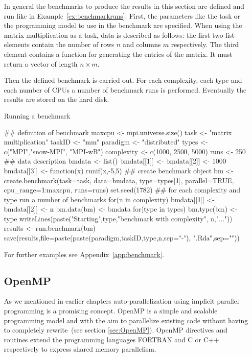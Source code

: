 In general the benchmarks to produce the results in this
section are defined and run like in
Example~\ref{ex:benchmarkruns}. First, the parameters like the task or
the programming model to use in the benchmark are specified. When using
the matrix multiplication as a task, data is described as follows: the
first two list elements contain the number of rows $n$ and columns $m$
respectively. The
third element contains a function for generating the entries of the
matrix. It must return a vector of length $n \times m$.

Then the defined benchmark is carried out. For each complexity,
each type and each number of CPUs a number of benchmark runs is
performed. Eventually the results are stored on the hard disk.

\begin{Example} Running a benchmark
\label{ex:benchmarkruns}
\begin{Scode}

## definition of benchmark
maxcpu <- mpi.universe.size()
task <- "matrix multiplication"
taskID <- "mm"
paradigm <- "distributed"
types <- c("MPI","snow-MPI", "MPI-wB")
complexity <- c(1000, 2500, 5000)
runs <- 250
## data description
bmdata <- list()
bmdata[[1]] <- bmdata[[2]] <- 1000
bmdata[[3]] <- function(x){
  runif(x,-5,5)
}
## create benchmark object
bm <- create.benchmark(task=task, data=bmdata,
                       type=types[1], parallel=TRUE,
                       cpu_range=1:maxcpu, runs=runs)
set.seed(1782)
## for each complexity and type run a number of benchmarks
for(n in complexity){
  bmdata[[1]] <- bmdata[[2]] <- n
  bm.data(bm) <- bmdata
  for(type in types){
    bm.type(bm) <- type
    writeLines(paste("Starting",type,"benchmark with complexity",
               n,"..."))
    results <- run.benchmark(bm)
    save(results,file=paste(paste(paradigm,taskID,type,n,sep="-"),
         ".Rda",sep=""))
  }
}

\end{Scode}
\end{Example}
For further examples see Appendix~\ref{app:benchmark}.

\subsection{OpenMP}

As we mentioned in earlier chapters auto-parallelization using
implicit parallel programming is a promising concept. OpenMP is a simple and
scalable programming model and with the aim to parallelize existing code
without having to completely rewrite~(see section
\ref{sec:OpenMP}). OpenMP directives and routines extend the
programming languages FORTRAN and C or C++ respectively to express
shared memory parallelism.

